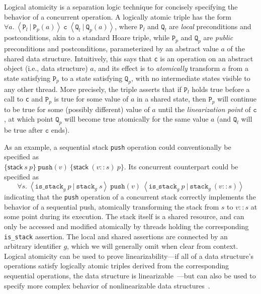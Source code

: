 \documentclass[a4paper,UKenglish,cleveref, autoref, thm-restate]{lipics-v2021}
\begin{document}
Logical atomicity is a separation logic technique for concisely specifying the behavior of a concurrent operation. A logically atomic triple has the form $\forall a.\ \left\langle \texttt{P}_l\ |\ \texttt{P}_p(a) \right\rangle\ \texttt{c}\ \left\langle \texttt{Q}_l\ |\ \texttt{Q}_p(a)\right\rangle$, where $\texttt{P}_l$ and $\texttt{Q}_l$ are \emph{local} preconditions and postconditions, akin to a standard Hoare triple, while $\texttt{P}_p$ and $\texttt{Q}_p$ are \emph{public} preconditions and postconditions, parameterized by an abstract value $a$ of the shared data structure. Intuitively, this says that \lstinline{c} is an operation on an abstract object (i.e., data structure) $a$, and its effect is to \emph{atomically} transform $a$ from a state satisfying $\texttt{P}_p$ to a state satisfying $\texttt{Q}_p$, with no intermediate states visible to any other thread. More precisely, the triple asserts that if $\texttt{P}_l$ holds true before a call to \lstinline{c} and $\texttt{P}_p$ is true for some value of $a$ in a shared state, then $\texttt{P}_p$ will continue to be true for some (possibly different) value of $a$ until the \emph{linearization point} of $\texttt{c}$, at which point $\texttt{Q}_p$ will become true atomically for the same value $a$ (and $\texttt{Q}_l$ will be true after $\texttt{c}$ ends).

As an example, a sequential stack \lstinline{push} operation could conventionally be specified as \\$\{\mathsf{stack}\ s\ p\}\ \texttt{push}(v)\ \{\mathsf{stack}\ (v :: s)\ p\}$. Its concurrent counterpart could be specified as 
$$\forall s.\ \left\langle \texttt{is\_stack}_g\ p\ |\ \texttt{stack}_g\ s\right\rangle\ \texttt{push}(v)\ \left\langle \texttt{is\_stack}_g\ p\ |\ \texttt{stack}_g\ (v::s)\right\rangle$$
indicating that the \lstinline{push} operation of a concurrent stack correctly implements the behavior of a sequential push, atomically transforming the stack from $s$ to $v::s$ at some point during its execution. The stack itself is a shared resource, and can only be accessed and modified atomically by threads holding the corresponding \texttt{is\_stack} assertion. The local and shared assertions are connected by an arbitrary identifier $g$, which we will generally omit when clear from context. Logical atomicity can be used to prove linearizability---if all of a data structure's operations satisfy logically atomic triples derived from the corresponding sequential operations, the data structure is linearizable~\cite{la-lin}---but can also be used to specify more complex behavior of nonlinearizable data structures~\cite{compass}.
\end{document}
